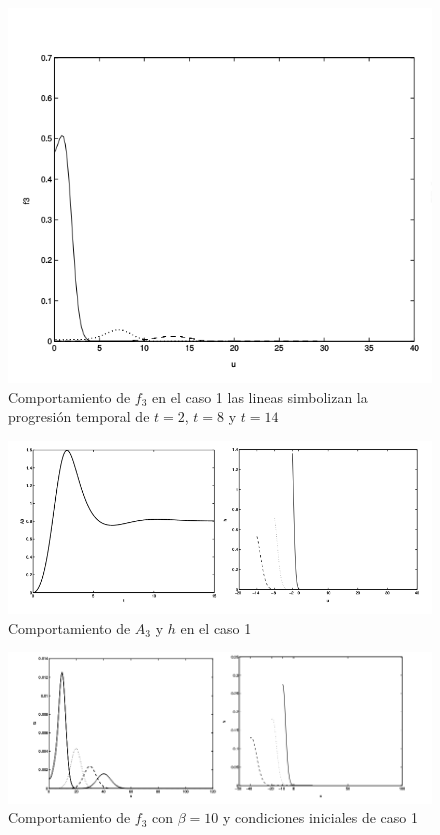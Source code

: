 \documentclass[1p]{elsarticle}
\begin{document}
\begin{figure}
	\centering
	\includegraphics[width=1\textwidth]{test1F3.png}
	\caption{Comportamiento de $f_3$ en el caso 1 las lineas simbolizan la progresión temporal de $t=2$, $t=8$ y $t=14$ }
	\label{fig:ejemplo3}
\end{figure}
\begin{figure}
	\centering
	\includegraphics[width=1\textwidth]{test1A3H.png}
	\caption{Comportamiento de $A_3$ y $h$ en el caso 1}
	\label{fig:ejemplo4}
\end{figure}
\begin{figure}
	\centering
	\includegraphics[width=1\textwidth]{test1extension.png}
	\caption{Comportamiento de $f_3$ con $\beta=10$ y condiciones iniciales de caso 1}
	\label{fig:ejemplo5}
\end{figure}
\end{document}
